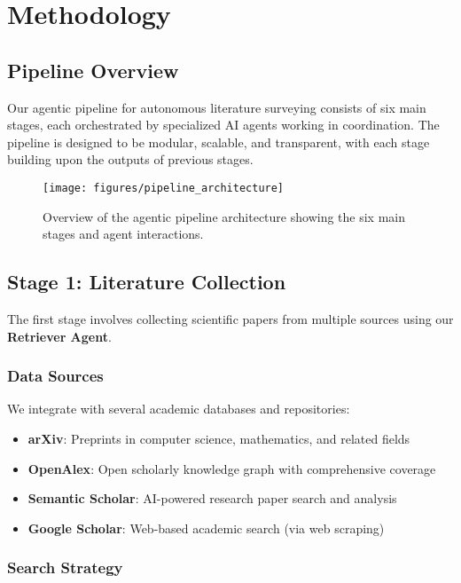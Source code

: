 \section{Methodology}

\subsection{Pipeline Overview}

Our agentic pipeline for autonomous literature surveying consists of six main stages, each orchestrated by specialized AI agents working in coordination. The pipeline is designed to be modular, scalable, and transparent, with each stage building upon the outputs of previous stages.

\begin{figure}[H]
\centering
\texttt{[image: figures/pipeline\_architecture]}
\caption{Overview of the agentic pipeline architecture showing the six main stages and agent interactions.}
\label{fig:pipeline_architecture}
\end{figure}

\subsection{Stage 1: Literature Collection}

The first stage involves collecting scientific papers from multiple sources using our \textbf{Retriever Agent}.

\subsubsection{Data Sources}

We integrate with several academic databases and repositories:
\begin{itemize}
    \item \textbf{arXiv}: Preprints in computer science, mathematics, and related fields
    \item \textbf{OpenAlex}: Open scholarly knowledge graph with comprehensive coverage
    \item \textbf{Semantic Scholar}: AI-powered research paper search and analysis
    \item \textbf{Google Scholar}: Web-based academic search (via web scraping)
\end{itemize}

\subsubsection{Search Strategy}

